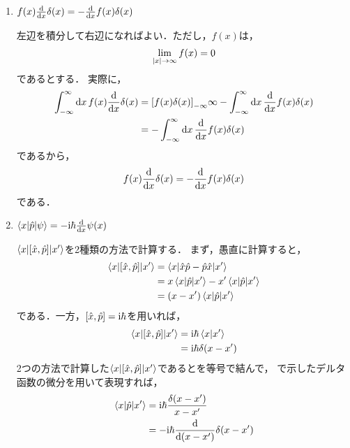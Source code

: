 \documentclass{report}
\begin{document}
    \begin{enumerate}
      \item $f(x)\dv{x}\delta(x) = -\dv{x}f(x)\delta(x)$\par
        左辺を積分して右辺になればよい．ただし，$f(x)$は，
        \begin{align}
          \lim_{\abs{x} \to \infty}f(x) = 0
        \end{align}
        であるとする．
        実際に，
        \begin{align}
          \int_{-\infty}^{\infty}\dd{x}f(x)\dv{x}\delta(x) &= \qty[f(x)\delta(x)]_{-\infty}{\infty} - \int_{-\infty}^{\infty}\dd{x}\dv{x}f(x)\delta(x) \\ 
          &= - \int_{-\infty}^{\infty}\dd{x}\dv{x}f(x)\delta(x)
        \end{align}
        であるから，
        \begin{align}
          f(x)\dv{x}\delta(x) = -\dv{x}f(x)\delta(x)\label{delta-function-diff}
        \end{align}
        である．  
      \item $\mel**{x}{\hat{p}}{\psi} = -\mathrm{i}\hbar\dv{x}\psi(x)$\par
        $\mel**{x}{\qty[\hat{x}, \hat{p}]}{x'}$を2種類の方法で計算する．
        まず，愚直に計算すると，
        \begin{align}
          \mel**{x}{\qty[\hat{x}, \hat{p}]}{x'} &= \mel**{x}{\hat{x}\hat{p} - \hat{p}\hat{x}}{x'} \\ 
          &= x\mel**{x}{\hat{p}}{x'} - x'\mel**{x}{\hat{p}}{x'} \\ 
          &= \qty(x - x')\mel**{x}{\hat{p}}{x'}\label{xxpxprime-1}
        \end{align}
        である．一方，$\qty[\hat{x}, \hat{p}] = \mathrm{i}\hbar$を用いれば，
        \begin{align}
          \mel**{x}{\qty[\hat{x}, \hat{p}]}{x'} &= \mathrm{i}\hbar\braket{x}{x'} \\ 
          &= \mathrm{i}\hbar\delta(x - x')\label{xxpxprime-2}
        \end{align}
        2つの方法で計算した$\mel**{x}{\qty[\hat{x}, \hat{p}]}{x'}$であるとを等号で結んで，
        で示したデルタ函数の微分を用いて表現すれば，
        \begin{align}
          \mel**{x}{\hat{p}}{x'} &= \i\hbar\frac{\delta(x - x')}{x - x'} \\ 
          &= -\i\hbar\dv{\qty(x - x')}\delta(x - x') \\ 

\end{align}
\end{enumerate}
\end{document}
